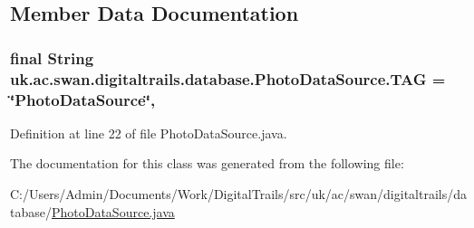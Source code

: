 \subsection{Member Data Documentation}
\hypertarget{classuk_1_1ac_1_1swan_1_1digitaltrails_1_1database_1_1_photo_data_source_ad0d4fe3b44c8cca24b59b25aabca43d9}{
\subsubsection[{T\+A\+G}]{\setlength{\rightskip}{0pt plus 5cm}final String uk.\+ac.\+swan.\+digitaltrails.\+database.\+Photo\+Data\+Source.\+T\+A\+G = \char`\"{}Photo\+Data\+Source\char`\"{}\hspace{0.3cm}{\ttfamily [static]}, {\ttfamily [private]}}}\label{classuk_1_1ac_1_1swan_1_1digitaltrails_1_1database_1_1_photo_data_source_ad0d4fe3b44c8cca24b59b25aabca43d9}


Definition at line 22 of file Photo\+Data\+Source.\+java.



The documentation for this class was generated from the following file\+:\begin{DoxyCompactItemize}
\item 
C\+:/\+Users/\+Admin/\+Documents/\+Work/\+Digital\+Trails/src/uk/ac/swan/digitaltrails/database/\hyperlink{_photo_data_source_8java}{Photo\+Data\+Source.\+java}\end{DoxyCompactItemize}

